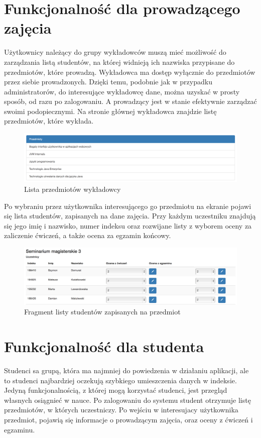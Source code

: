 \documentclass{xmgr}
\begin{document}
\section{Funkcjonalność dla prowadzącego zajęcia}

Użytkownicy należący do grupy wykładowców muszą mieć możliwość do zarządzania listą studentów, na której widnieją ich nazwiska przypisane do przedmiotów, które prowadzą. Wykładowca ma dostęp wyłącznie do przedmiotów przez siebie prowadzonych. Dzięki temu, podobnie jak w przypadku administratorów, do interesujące wykładowcę dane, można uzyskać w prosty sposób, od razu po zalogowaniu. A prowadzący jest w stanie efektywnie zarządzać swoimi podopiecznymi. Na stronie głównej wykładowca znajdzie listę przedmiotów, które wykłada.

\begin{figure}[th!]
\centering
\includegraphics[width=0.7\hsize]{images/subjectList} 
\caption{Lista przedmiotów wykładowcy\label{RYS.10}}
\end{figure}

Po wybraniu przez użytkownika interesującego go przedmiotu na ekranie pojawi się lista studentów,  zapisanych na dane zajęcia. Przy każdym uczestniku znajdują się jego imię i nazwisko, numer indeksu oraz rozwijane listy z wyborem oceny za zaliczenie ćwiczeń, a także ocena za egzamin końcowy.

\begin{figure}[th!]
\centering
\includegraphics[width=0.7\hsize]{images/studentList} 
\caption{Fragment listy studentów zapisanych na przedmiot\label{RYS.11}}
\end{figure}

\section{Funkcjonalność dla studenta}
Studenci sa grupą, która ma najmniej do powiedzenia w działaniu aplikacji, ale to studenci najbardziej oczekują szybkiego umieszczenia danych w indeksie. Jedyną funkcjonalnością, z której mogą korzystać studenci, jest przegląd własnych osiągnieć w nauce. Po zalogowaniu do systemu student otrzymuje listę przedmiotów, w których uczestniczy. Po wejściu w interesujacy użytkownika przedmiot, pojawią się informacje o prowadzącym zajęcia, oraz oceny z ćwiczeń i egzaminu.
\end{document}
